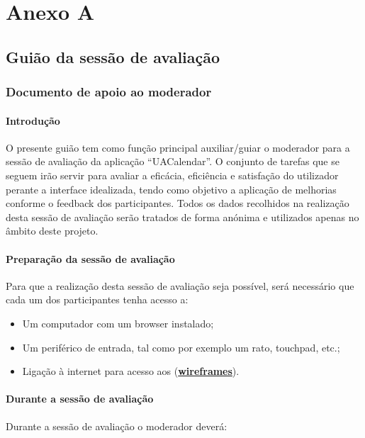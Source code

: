 \documentclass[11pt, twoside]{report}
\begin{document}
	
	
	

	

	
	\chapter*{Anexo A}
	
	\pagestyle{empty}
	
	\section*{Guião da sessão de avaliação}
	\subsection*{Documento de apoio ao moderador}
	
	
	\subsubsection*{Introdução}
	O presente guião tem como função principal auxiliar/guiar o moderador para a sessão de avaliação da aplicação “UACalendar”. O conjunto de tarefas que se seguem irão servir para avaliar a eficácia, eficiência e satisfação do utilizador perante a interface idealizada, tendo como objetivo a aplicação de melhorias conforme o feedback dos participantes.
	Todos os dados recolhidos na realização desta sessão de avaliação serão tratados de forma anónima e utilizados apenas no âmbito deste projeto.
	
	
	\subsubsection*{Preparação da sessão de avaliação}
	Para que a realização desta sessão de avaliação seja possível, será necessário que cada um dos participantes tenha acesso a:
	
	\begin{itemize}
		\item Um computador com um browser instalado;
		\item Um periférico de entrada, tal como por exemplo um rato, touchpad, etc.;
		\item Ligação à internet para acesso aos (\href{https://www.figma.com/file/nhb5nnIrt3fdDoQhYpsN80/Calendario?node-id=9\%3A154}{\textbf{wireframes}}).
	\end{itemize}
	
	\subsubsection*{Durante a sessão de avaliação}	
	Durante a sessão de avaliação o moderador deverá:
	
\end{document}

